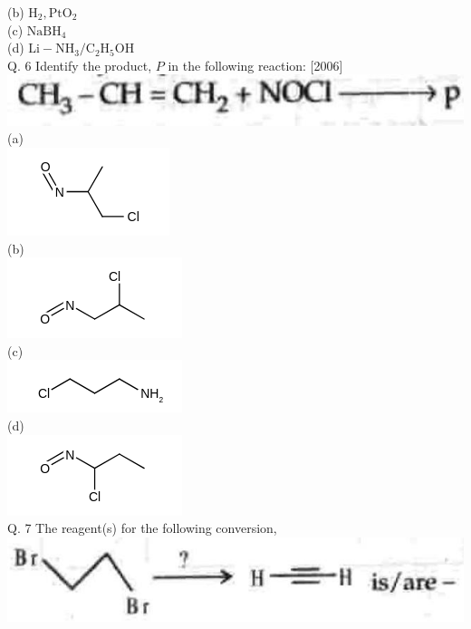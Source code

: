 \documentclass[10pt]{article}
\begin{document}
(b) $\mathrm{H}_{2}, \mathrm{PtO}_{2}$\\
(c) $\mathrm{NaBH}_{4}$\\
(d) $\mathrm{Li}-\mathrm{NH}_{3} / \mathrm{C}_{2} \mathrm{H}_{5} \mathrm{OH}$\\
Q. 6 Identify the product, $P$ in the following reaction: [2006]\\
\includegraphics[max width=\textwidth, center]{2025_01_28_8470952b98110cec3aabg-239(1)}\\
(a)\\
\includegraphics{smile-cf4564dd53056c15ecb2b5e8a9fe33a188f95907}\\
(b)\\
\includegraphics{smile-369a50245958977d27f0bd58484b9837bab1dd5a}\\
(c)\\
\includegraphics{smile-61d2f31b0b87d56f9d1de9dafe86a0433937c240}\\
(d)\\
\includegraphics{smile-fc11082fb2dd99de88d3ecadc5da57e2eb41faef}\\
Q. 7 The reagent(s) for the following conversion,\\
\includegraphics[max width=\textwidth, center]{2025_01_28_8470952b98110cec3aabg-239}\\[0pt]
\end{document}
